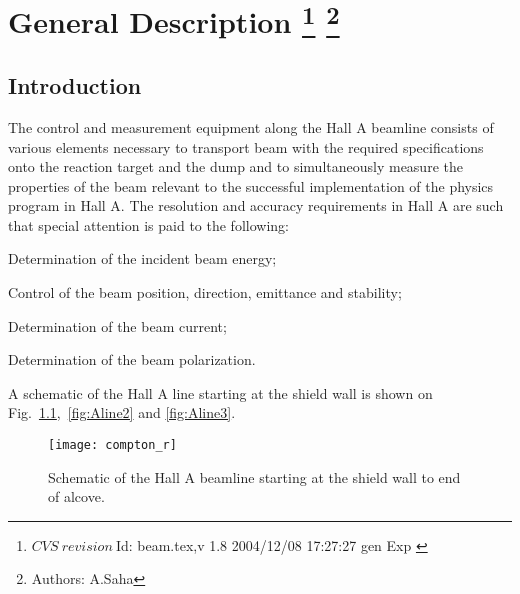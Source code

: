 \chapter[General Description]{General Description
\footnote{
  $CVS~revision~ $Id: beam.tex,v 1.8 2004/12/08 17:27:27 gen Exp $ $
}
\footnote{Authors: A.Saha }
}
\section{Introduction}


The control and measurement equipment along the Hall A beamline consists of 
various elements necessary to transport beam with the required specifications 
onto the reaction target and the dump and to simultaneously measure the 
properties of the beam relevant to the successful implementation of the 
physics program in Hall A.  The resolution and accuracy requirements in Hall 
A are such that special attention is paid to the following:
\begin{list}{.~}{\setlength{\itemsep}{-0.15cm}}
  \item Determination of the incident beam energy;
  \item Control of the beam position, direction, emittance and stability;
  \item Determination of the beam current;
  \item Determination of the beam polarization.
\end{list}

A schematic of the Hall A line starting at the shield wall is
shown on Fig.~\ref{fig:Aline1},~\ref{fig:Aline2} and \ref{fig:Aline3}. 

\begin{figure}
\begin{center}
\texttt{[image: compton\_r]}
\caption[Beamline: Hall A Beamline Overview]{Schematic of the Hall A beamline
starting at the shield wall to end of alcove.}
\label{fig:Aline1}
\end{center}
\end{figure}


